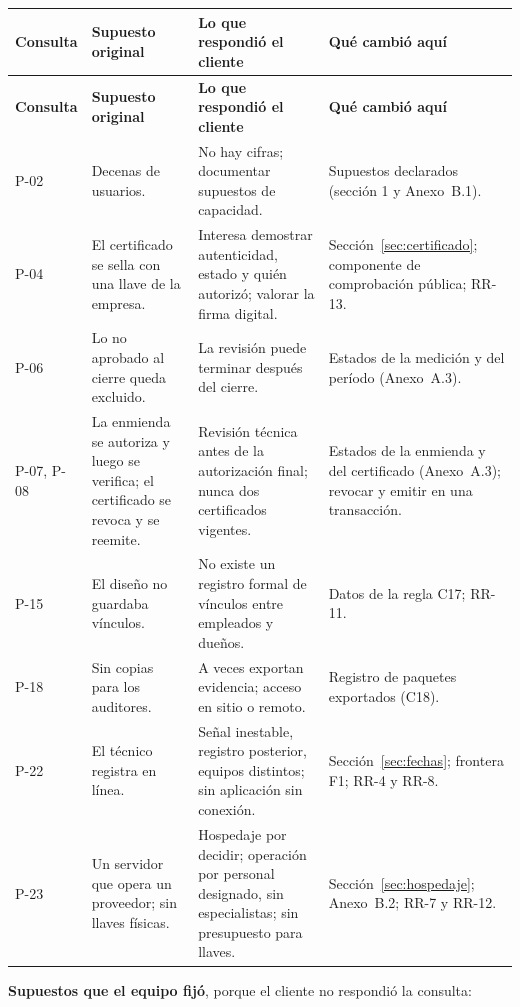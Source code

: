 \documentclass[11pt,letterpaper]{article}
\newcommand{\cab}[1]{\textbf{\rmfamily #1}}
\begin{document}
{\small
\renewcommand{\arraystretch}{1.22}
\begin{longtable}{@{}L{1.2cm} L{4.2cm} L{5.4cm} L{4.6cm}@{}}
\toprule
\cab{Consulta} & \cab{Supuesto original} & \cab{Lo que respondió el cliente} & \cab{Qué cambió aquí} \\
\midrule
\endfirsthead
\toprule
\cab{Consulta} & \cab{Supuesto original} & \cab{Lo que respondió el cliente} & \cab{Qué cambió aquí} \\
\midrule
\endhead
\bottomrule
\endfoot
P-02 & Decenas de usuarios. & No hay cifras; documentar supuestos de capacidad. & Supuestos declarados (sección 1 y Anexo~B.1). \\
P-04 & El certificado se sella con una llave de la empresa. & Interesa demostrar autenticidad, estado y quién autorizó; valorar la firma digital. & Sección~\ref{sec:certificado}; componente de comprobación pública; RR-13. \\
P-06 & Lo no aprobado al cierre queda excluido. & La revisión puede terminar después del cierre. & Estados de la medición y del período (Anexo~A.3). \\
P-07, P-08 & La enmienda se autoriza y luego se verifica; el certificado se revoca y se reemite. & Revisión técnica antes de la autorización final; nunca dos certificados vigentes. & Estados de la enmienda y del certificado (Anexo~A.3); revocar y emitir en una transacción. \\
P-15 & El diseño no guardaba vínculos. & No existe un registro formal de vínculos entre empleados y dueños. & Datos de la regla C17; RR-11. \\
P-18 & Sin copias para los auditores. & A veces exportan evidencia; acceso en sitio o remoto. & Registro de paquetes exportados (C18). \\
P-22 & El técnico registra en línea. & Señal inestable, registro posterior, equipos distintos; sin aplicación sin conexión. & Sección~\ref{sec:fechas}; frontera F1; RR-4 y RR-8. \\
P-23 & Un servidor que opera un proveedor; sin llaves físicas. & Hospedaje por decidir; operación por personal designado, sin especialistas; sin presupuesto para llaves. & Sección~\ref{sec:hospedaje}; Anexo~B.2; RR-7 y RR-12. \\
\end{longtable}
}

\textbf{Supuestos que el equipo fijó}, porque el cliente no respondió la consulta:
\end{document}

